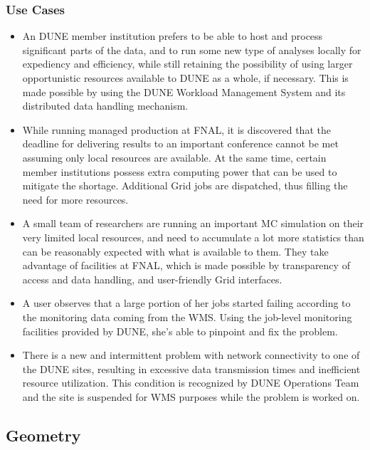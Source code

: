 \subsubsection{Use Cases}
\begin{itemize}
	\item  An  DUNE member institution prefers to be able to host and process significant parts of the data, and to run some new type of analyses locally for expediency and efficiency, while still retaining the possibility of using larger opportunistic resources available to DUNE as a whole, if necessary. This is made possible by using the DUNE Workload Management System and its distributed data handling mechanism.
	
	\item  While running managed production at FNAL, it is discovered that the deadline for delivering results to an important conference cannot be met assuming only local resources are available. At the same time, certain member institutions possess extra computing power that can be used to mitigate the shortage. Additional Grid jobs are dispatched, thus filling the need for more resources.
	
	\item A small team of researchers are running an important MC simulation on their very limited local resources, and need to accumulate a lot more statistics than can be reasonably expected with what is available to them. They take advantage of facilities at FNAL, which is made possible by transparency of access and data handling, and user-friendly Grid interfaces.
	
	\item A user observes that a large portion of her jobs started failing according to the monitoring data coming from the WMS. Using the job-level monitoring facilities provided by DUNE, she's able to pinpoint and fix the problem.
	
	\item There is a new and intermittent problem with network connectivity to one of the DUNE sites, resulting in excessive data transmission times and inefficient resource utilization. This condition is recognized by DUNE Operations Team and the site is suspended for WMS purposes while the problem is worked on.
\end{itemize}


\subsection{Geometry}
